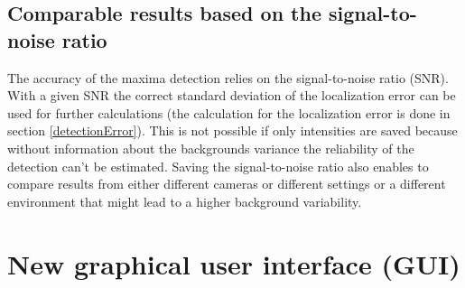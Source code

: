 \subsection{Comparable results based on the signal-to-noise ratio}
The accuracy of the maxima detection relies on the signal-to-noise ratio (SNR). With a given SNR the correct standard deviation of the localization error can be used for further calculations (the calculation for the localization error is done in section \ref{detectionError}). This is not possible if only intensities are saved because without information about the backgrounds variance the reliability of the detection can't be estimated.\newline
Saving the signal-to-noise ratio also enables to compare results from either different cameras or different settings or a different environment that might lead to a higher background variability.  


\section{New graphical user interface (GUI)}
